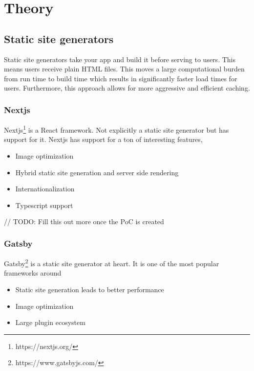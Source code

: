 
\chapter{Theory} %

\label{Chapter3} 


\section{Static site generators}

Static site generators take your app and build it before serving to users. 
This means users receive plain HTML files. This moves a large computational burden from run time to build time which results in significantly faster load times for users.
Furthermore, this approach allows for more aggressive and efficient caching.

\subsection{Nextjs}

Nextjs\footnote{https://nextjs.org/} is a React framework. Not explicitly a static site generator but has support for it. Nextjs has support for a ton of interesting features, 

\begin{itemize}
	\item Image optimization
	\item Hybrid static site generation and server side rendering
	\item Internationalization
	\item Typescript support
\end{itemize}

// TODO: Fill this out more once the PoC is created

\subsection{Gatsby}

Gatsby\footnote{https://www.gatsbyjs.com/} is a static site generator at heart. It is one of the most popular frameworks around \cite{jamstackorg-generators}

\begin{itemize}
	\item Static site generation leads to better performance
	\item Image optimization
	\item Large plugin ecosystem
\end{itemize}



